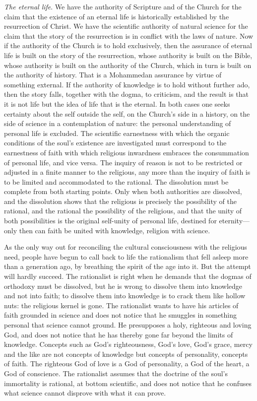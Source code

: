 \documentclass[12pt,a4paper,openany]{book}
\newcommand{\opage}[1]{\marginnote{\footnotesize\textit{[#1]}}}
\begin{document}
\emph{The eternal life}. We have the authority of Scripture and of the Church
for the claim that the existence of an eternal life is historically
established by the resurrection of Christ. We have the scientific
authority of natural science for the claim that the story of the
resurrection is in conflict with the laws of nature. Now if the authority
of the Church is to hold exclusively, then the assurance of eternal life
is built on the story of the resurrection, whose authority is built on
the Bible, whose authority is built on the authority of the Church, which
in turn is built on the authority of history. That is a Mohammedan
assurance by virtue of something external. If the authority of
knowledge is to hold without further ado, then the story falls, together
with the dogma, to criticism, and the result is that it is not life but
the idea of life that is the eternal. In both cases one seeks certainty
about the self outside the self, on the Church's side in a history, on
the side of science in a contemplation of nature: the personal
understanding of personal life is excluded. The scientific earnestness
with which \opage{32}the organic conditions of the soul's existence are
investigated must correspond to the earnestness of faith with which
religious inwardness embraces the consummation of personal life, and
vice versa. The inquiry of reason is not to be restricted or adjusted in
a finite manner to the religious, any more than the inquiry of faith is
to be limited and accommodated to the rational. The dissolution must be
complete from both starting points. Only when both authorities are
dissolved, and the dissolution shows that the religious is precisely the
possibility of the rational, and the rational the possibility of the
religious, and that the unity of both possibilities is the original
self-unity of personal life, destined for eternity---only then can faith
be united with knowledge, religion with science.

As the only way out for reconciling the cultural consciousness with the
religious need, people have begun to call back to life the rationalism
that fell asleep more than a generation ago, by breathing the spirit of
the age into it. But the attempt will hardly succeed. The rationalist is
right when he demands that the dogmas of orthodoxy must be dissolved, but
he is wrong to dissolve them into knowledge and not into faith; to
dissolve them into knowledge is to crack them like hollow nuts: the
religious kernel is gone. The rationalist wants to have his articles of
faith grounded in science and does not notice that he smuggles in
something personal that science cannot ground. He presupposes a holy,
righteous and loving God, and does not notice that he has thereby gone
far beyond the limits of knowledge. Concepts such as God's
righteousness, God's love, God's grace, mercy and the like are not
concepts of knowledge but concepts of personality, concepts of faith. The
righteous God of love is a God of personality, \opage{33}a God of the heart, a God
of conscience. The rationalist assumes that the doctrine of the soul's
immortality is rational, at bottom scientific, and does not notice that
he confuses what science cannot disprove with what it can prove.
\end{document}
